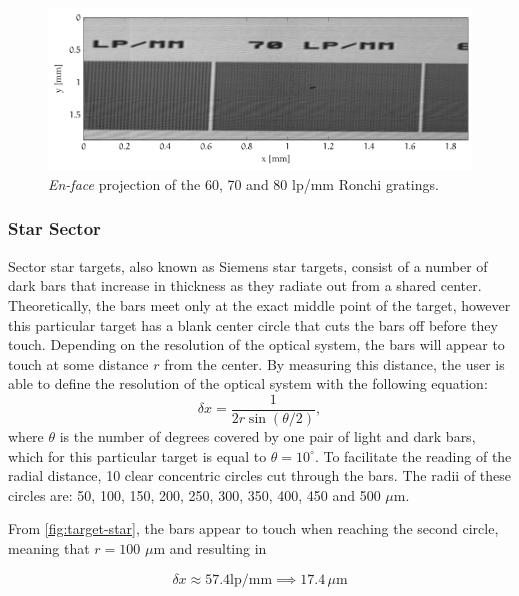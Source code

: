 \begin{figure}[hbt]
	\centering
	\includegraphics[width=1\linewidth]{gfx/ch4/axsun/target/ronchi-detail}
	\caption{\emph{En-face} projection of the 60, 70 and 80 lp/mm Ronchi gratings.}\label{fig:target-ronchi-detail}
\end{figure}

\subsubsection{Star Sector}
Sector star targets, also known as Siemens star targets, consist of a number of dark bars that increase in thickness as they radiate out from a shared center. Theoretically, the bars meet only at the exact middle point of the target, however this particular target has a blank center circle that cuts the bars off before they touch. Depending on the resolution of the optical system, the bars will appear to touch at some distance $r$ from the center. By measuring this distance, the user is able to define the resolution of the optical system with the following equation:
\begin{equation}
 \delta x  = \frac{1}{2r \sin(\theta / 2)},
\end{equation}
where $\theta$ is the number of degrees covered by one pair of light and dark bars, which for this particular target is equal to $\theta = 10^\circ$. To facilitate the reading of the radial distance, 10 clear concentric circles cut through the bars. The radii of these circles are: 50, 100, 150, 200, 250, 300, 350, 400, 450 and 500 $\mu$m. 

From \autoref{fig:target-star}, the bars appear to touch when reaching the second circle, meaning that $r = 100$ $\mu$m and resulting in

\begin{equation}
	\delta x \approx 57.4 \text{lp/mm} \implies 17.4\, \mu\text{m}
\end{equation}


